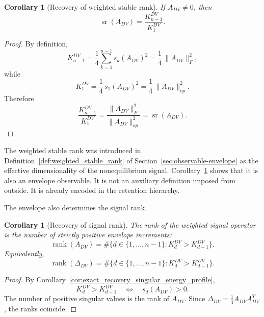 \documentclass[11pt,a4paper]{article}
\numberwithin{equation}{section}
\theoremstyle{thmcompact}
\newtheorem{corollary}[theorem]{Corollary}
\theoremstyle{remark}
\begin{document}
\begin{corollary}[Recovery of weighted stable rank]
\label{cor:exact_recovery_weighted_stable_rank}
If \(A_{DV}\neq 0\), then
\begin{equation}
\operatorname{sr}(A_{DV})
=
\frac{K_{n-1}^{DV}}{K_1^{DV}}.
\end{equation}
\end{corollary}

\begin{proof}
By definition,
\begin{equation}
K_{n-1}^{DV}
=
\frac14\sum_{k=1}^{n-1}s_k(A_{DV})^2
=
\frac14\,\|A_{DV}\|_F^2,
\end{equation}
while
\begin{equation}
K_1^{DV}
=
\frac14\,s_1(A_{DV})^2
=
\frac14\,\|A_{DV}\|_{op}^2.
\end{equation}
Therefore
\begin{equation}
\frac{K_{n-1}^{DV}}{K_1^{DV}}
=
\frac{\|A_{DV}\|_F^2}{\|A_{DV}\|_{op}^2}
=
\operatorname{sr}(A_{DV}).
\end{equation}
\end{proof}

The weighted stable rank was introduced in Definition~\ref{def:weighted_stable_rank} of Section~\ref{sec:observable-envelope} as the effective dimensionality of the nonequilibrium signal. Corollary~\ref{cor:exact_recovery_weighted_stable_rank} shows that it is also an envelope observable. It is not an auxiliary definition imposed from outside. It is already encoded in the retention hierarchy.

The envelope also determines the signal rank.

\begin{corollary}[Recovery of signal rank]
\label{cor:exact_recovery_signal_rank}
The rank of the weighted signal operator is the number of strictly positive envelope increments:
\begin{equation}
\operatorname{rank}(A_{DV})
=
\#\{d\in\{1,\dots,n-1\}:K_d^{DV}>K_{d-1}^{DV}\}.
\end{equation}
Equivalently,
\begin{equation}
\operatorname{rank}(\Delta_{DV})
=
\#\{d\in\{1,\dots,n-1\}:K_d^{DV}>K_{d-1}^{DV}\}.
\end{equation}
\end{corollary}

\begin{proof}
By Corollary~\ref{cor:exact_recovery_singular_energy_profile},
\begin{equation}
K_d^{DV}>K_{d-1}^{DV}
\quad\Longleftrightarrow\quad
s_d(A_{DV})>0.
\end{equation}
The number of positive singular values is the rank of \(A_{DV}\). Since \(\Delta_{DV}=\frac14 A_{DV}A_{DV}^T\), the ranks coincide.
\end{proof}
\end{document}
